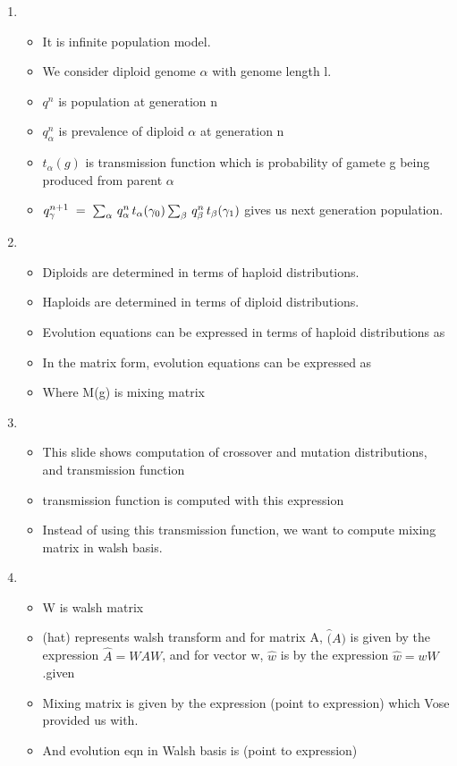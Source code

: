 \documentclass{article}
\begin{document}
\begin{enumerate}
\item
  \begin{itemize}
  \item It is infinite population model.
  \item We consider diploid genome $\alpha$ with genome length l.
  \item $q^n$ is population at generation n
  \item $q^n_\alpha$ is prevalence of diploid $\alpha$ at generation n
  \item $t_{\alpha}(g)$ is transmission function which is probability
    of gamete g being produced from parent $\alpha$
  \item $q_\gamma^{n+1} \; = \; \sum_{\alpha} \, q_\alpha^n \,
    t_\alpha(\gamma_0) \sum_{\beta} \,q_\beta^n \,
    t_\beta(\gamma_1)\\[-.05in]$ gives us next generation population.
  \end{itemize}
    
\item
  \begin{itemize}
  \item Diploids are determined in terms of haploid
    distributions.
  \item Haploids are determined in terms of diploid
    distributions.
  \item Evolution equations can be expressed in terms of haploid
    distributions as
  \item In the matrix form, evolution equations can be expressed as
  \item Where M(g) is mixing matrix
  \end{itemize}
    
\item
  \begin{itemize}
  \item This slide shows computation of crossover and mutation
    distributions, and transmission function  
  \item transmission function is computed with this expression
  \item Instead of using this transmission function, we want to
    compute mixing matrix in walsh basis.
  \end{itemize}
    
\item
  \begin{itemize}
  \item W is walsh matrix
  \item (hat) represents walsh transform and for matrix A, $\hat(A)$
    is given by the expression $\widehat{A} = WAW$, and for vector w, $\hat{w}$ is 
    by the expression $\widehat{w} = wW$.given
  \item Mixing matrix is given by the expression (point to expression)
    which Vose provided us with.
  \item And evolution eqn in Walsh basis is (point to expression)
  \end{itemize}
    

\end{enumerate}
\end{document}
